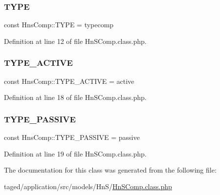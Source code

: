 \subsubsection{\texorpdfstring{T\+Y\+PE}{TYPE}}
{\footnotesize\ttfamily const Hns\+Comp\+::\+T\+Y\+PE = \textquotesingle{}typecomp\textquotesingle{}}



Definition at line 12 of file Hn\+S\+Comp.\+class.\+php.

\mbox{\label{class_hns_comp_abc4269859fdd958b957c27312cea417c}} 
\subsubsection{\texorpdfstring{T\+Y\+P\+E\+\_\+\+A\+C\+T\+I\+VE}{TYPE\_ACTIVE}}
{\footnotesize\ttfamily const Hns\+Comp\+::\+T\+Y\+P\+E\+\_\+\+A\+C\+T\+I\+VE = \textquotesingle{}active\textquotesingle{}}



Definition at line 18 of file Hn\+S\+Comp.\+class.\+php.

\mbox{\label{class_hns_comp_adaa5ce719a7ccdb21775b6cd56914a9c}} 
\subsubsection{\texorpdfstring{T\+Y\+P\+E\+\_\+\+P\+A\+S\+S\+I\+VE}{TYPE\_PASSIVE}}
{\footnotesize\ttfamily const Hns\+Comp\+::\+T\+Y\+P\+E\+\_\+\+P\+A\+S\+S\+I\+VE = \textquotesingle{}passive\textquotesingle{}}



Definition at line 19 of file Hn\+S\+Comp.\+class.\+php.



The documentation for this class was generated from the following file\+:\begin{DoxyCompactItemize}
\item 
taged/application/src/models/\+Hn\+S/\hyperlink{_hn_s_comp_8class_8php}{Hn\+S\+Comp.\+class.\+php}\end{DoxyCompactItemize}
